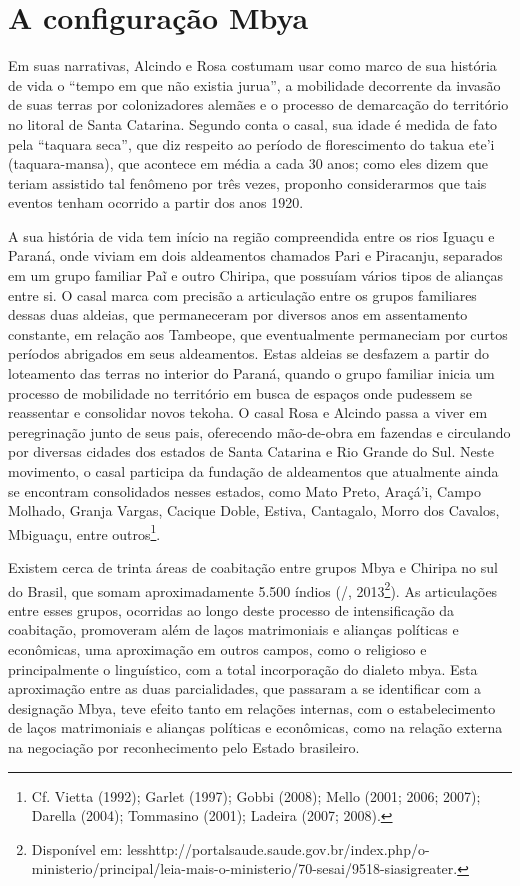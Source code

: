 {{\section{A configuração Mbya}

Em suas narrativas, Alcindo e Rosa costumam usar como marco de sua
história de vida o ``tempo em que não existia jurua'', a mobilidade
decorrente da invasão de suas terras por colonizadores alemães e o
processo de demarcação do território no litoral de Santa Catarina.
Segundo conta o casal, sua idade é medida de fato pela ``taquara seca'',
que diz respeito ao período de florescimento do takua ete’i
(taquara-mansa), que acontece em média a cada 30 anos; como eles dizem
que teriam assistido tal fenômeno por três vezes, proponho
considerarmos que tais eventos tenham ocorrido a partir dos anos 1920.

A sua história de vida tem início na região compreendida entre os rios
Iguaçu e Paraná, onde viviam em dois aldeamentos chamados Pari e
Piracanju, separados em um grupo familiar Paĩ e
outro Chiripa, que possuíam vários tipos de alianças entre si. O casal
marca com precisão a articulação entre os grupos familiares dessas duas
aldeias, que permaneceram por diversos anos em assentamento constante,
em relação aos Tambeope, que eventualmente permaneciam por curtos
períodos abrigados em seus aldeamentos. Estas aldeias se desfazem a
partir do loteamento das terras no interior do Paraná, quando o grupo
familiar inicia um processo de mobilidade no território em busca de
espaços onde pudessem se reassentar e consolidar novos tekoha. O casal
Rosa e Alcindo passa a viver em peregrinação junto de seus pais,
oferecendo mão-de-obra em fazendas e circulando por diversas cidades
dos estados de Santa Catarina e Rio Grande do Sul. Neste movimento, o
casal participa da fundação de aldeamentos que atualmente ainda se
encontram consolidados nesses estados, como Mato Preto, Araçá’i, Campo
Molhado, Granja Vargas, Cacique Doble, Estiva, Cantagalo, Morro dos
Cavalos, Mbiguaçu, entre outros\footnote{Cf. Vietta (1992); Garlet
(1997); Gobbi (2008); Mello (2001; 2006; 2007); Darella (2004);
Tommasino (2001); Ladeira (2007; 2008).}.

Existem cerca de trinta áreas de coabitação entre grupos Mbya e Chiripa
no sul do Brasil, que somam aproximadamente 5.500 índios (/,
2013\footnote{Disponível em:
{less}http://portalsaude.saude.gov.br/index.php/o-ministerio/principal/leia-mais-o-ministerio/70-sesai/9518-siasi{greater}.}).
As articulações entre esses grupos, ocorridas ao longo deste processo
de intensificação da coabitação, promoveram além de laços matrimoniais
e alianças políticas e econômicas, uma aproximação em outros campos,
como o religioso e principalmente o linguístico, com a total
incorporação do dialeto mbya. Esta aproximação entre as duas
parcialidades, que passaram a se identificar com a designação Mbya,
teve efeito tanto em relações internas, com o estabelecimento de laços
matrimoniais e alianças políticas e econômicas, como na relação externa
na negociação por reconhecimento pelo Estado brasileiro.

}}
